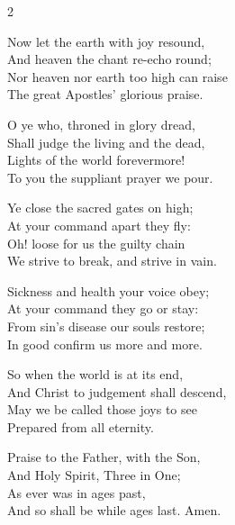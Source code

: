 \begin{multicols}{2}
\begin{enpars}
Now let the earth with joy resound,\\
And heaven the chant re-echo round;\\
Nor heaven nor earth too high can raise\\
The great Apostles' glorious praise.

O ye who, throned in glory dread,\\
Shall judge the living and the dead,\\
Lights of the world forevermore!\\
To you the suppliant prayer we pour.

Ye close the sacred gates on high;\\
At your command apart they fly:\\
Oh! loose for us the guilty chain\\
We strive to break, and strive in vain.

Sickness and health your voice obey;\\
At your command they go or stay:\\
From sin's disease our souls restore;\\
In good confirm us more and more.

So when the world is at its end,\\
And Christ to judgement shall descend,\\
May we be called those joys to see\\
Prepared from all eternity.

Praise to the Father, with the Son,\\
And Holy Spirit, Three in One;\\
As ever was in ages past,\\
And so shall be while ages last. Amen.
\end{enpars}
\end{multicols}